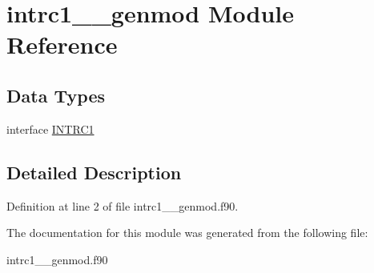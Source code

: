 \hypertarget{classintrc1____genmod}{\section{intrc1\+\_\+\+\_\+genmod Module Reference}
\label{classintrc1____genmod}
}
\subsection*{Data Types}
\begin{DoxyCompactItemize}
\item 
interface \hyperlink{interfaceintrc1____genmod_1_1_i_n_t_r_c1}{I\+N\+T\+R\+C1}
\end{DoxyCompactItemize}


\subsection{Detailed Description}


Definition at line 2 of file intrc1\+\_\+\+\_\+genmod.\+f90.



The documentation for this module was generated from the following file\+:\begin{DoxyCompactItemize}
\item 
intrc1\+\_\+\+\_\+genmod.\+f90\end{DoxyCompactItemize}
